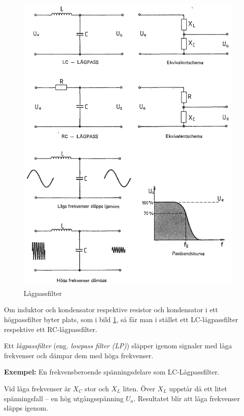 \begin{figure}
\includegraphics[width=\textwidth]{images/cropped_pdfs/bild_2_3-23.pdf}
\caption{Lågpassfilter}
\label{fig:BildII3-23}
\end{figure}

Om induktor och kondensator respektive resistor och kondensator i ett
högpassfilter byter plats, som i bild \ref{fig:BildII3-23}, så får man i
stället ett LC-lågpassfilter respektive ett RC-lågpassfilter.

Ett \emph{lågpassfilter} (eng. \emph{lowpass filter (LP)}) släpper igenom
signaler med låga frekvenser och dämpar dem med höga frekvenser.

\textbf{Exempel:} En frekvensberoende spänningsdelare som LC-Lågpassfilter.

Vid låga frekvenser är \(X_C\) stor och \(X_L\) liten.
Över \(X_L\) uppstår då ett litet spänningsfall -- en hög utgångsspänning
\(U_a\).
Resultatet blir att låga frekvenser släpps igenom.

